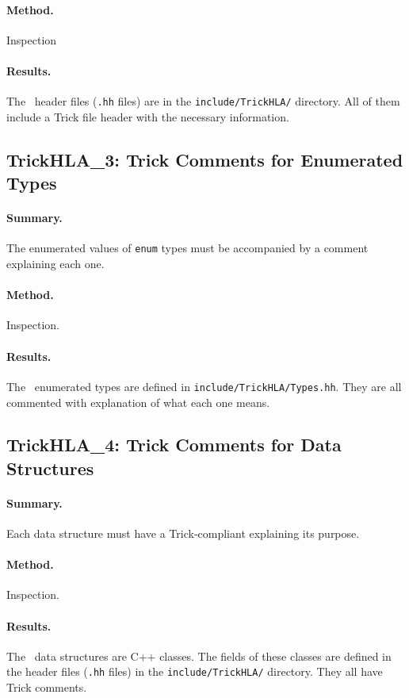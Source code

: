 \paragraph{Method.} Inspection
\paragraph{Results.}
The \TrickHLA\ header files ({\tt .hh} files) are in the
{\tt include/TrickHLA/} directory.
All of them include a Trick file header with the necessary information.

\subsection{TrickHLA\_3: Trick Comments for Enumerated Types}
\paragraph{Summary.}
The enumerated values of {\tt enum} types must be accompanied by a comment
explaining each one.
\paragraph{Method.} Inspection.
\paragraph{Results.}
The \TrickHLA\ enumerated types are defined in {\tt include/TrickHLA/Types.hh}.
They are all commented with explanation of what each one means.

\subsection{TrickHLA\_4: Trick Comments for Data Structures}
\paragraph{Summary.}
Each data structure must have a Trick-compliant explaining its purpose.
\paragraph{Method.} Inspection.
\paragraph{Results.}
The \TrickHLA\ data structures are C++ classes.
The fields of these classes are defined in the header files
({\tt .hh} files) in the {\tt include/TrickHLA/} directory.
They all have Trick comments.

